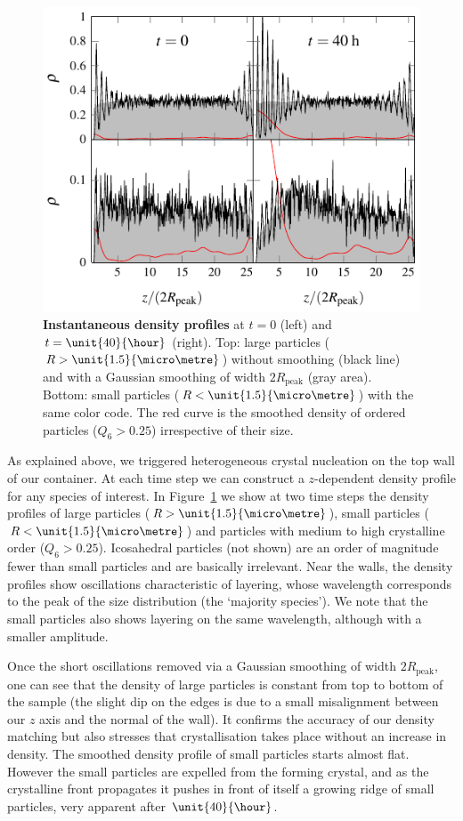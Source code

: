 \documentclass[8.5pt,twoside,twocolumn]{article}
\begin{document}
\begin{figure}
	\centering
	\includegraphics{fig_profiles.pdf}
	\caption{\textbf{Instantaneous density profiles} at $t=0$ (left) and $t=\unit{40}{\hour}$ (right). Top: large particles ($R>\unit{1.5}{\micro\metre}$) without smoothing (black line) and with a Gaussian smoothing of width $2R_\text{peak}$ (gray area). Bottom: small particles ($R<\unit{1.5}{\micro\metre}$) with the same color code. The red curve is the smoothed density of ordered particles ($Q_6>0.25$) irrespective of their size.}
	\label{fig:profiles}
\end{figure}

As explained above, we triggered heterogeneous crystal nucleation on the top wall of our container. At each time step we can construct a $z$-dependent density profile for any species of interest. In Figure~\ref{fig:profiles} we show at two time steps the density profiles of large particles ($R>\unit{1.5}{\micro\metre}$), small particles ($R<\unit{1.5}{\micro\metre}$) and particles with medium to high crystalline order ($Q_6>0.25$). Icosahedral particles (not shown) are an order of magnitude fewer than small particles and are basically irrelevant. Near the walls, the density profiles show oscillations characteristic of layering, whose wavelength corresponds to the peak of the size distribution (the `majority species'). We note that the small particles also shows layering on the same wavelength, although with a smaller amplitude.

Once the short oscillations removed via a Gaussian smoothing of width $2R_\text{peak}$, one can see that the density of large particles is constant from top to bottom of the sample (the slight dip on the edges is due to a small misalignment between our $z$ axis and the normal of the wall). It confirms the accuracy of our density matching but also stresses that crystallisation takes place without an increase in density. The smoothed density profile of small particles starts almost flat. However the small particles are expelled from the forming crystal, and as the crystalline front propagates it pushes in front of itself a growing ridge of small particles, very apparent after $\unit{40}{\hour}$.
\end{document}
